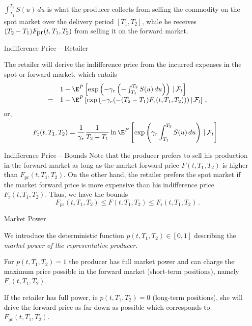 $\int_{T_1}^{T_2}S(u)\,du$ is what the
producer collects from selling the commodity on the spot market
over the delivery period $[T_1,T_2]$, while he receives
$(T_2-T_1)F_{\hbox{pr}}(t,T_1,T_2)$ from selling it on the forward
market.

{Indifference Price -- Retailer}

The retailer will derive the indifference price from the incurred expenses
in the spot or forward market, which entails
$$
\begin{array}{ll}
&1-\E^P\left[\exp\left(-\gamma_r\left(-\int_{T_1}^{T_2}S(u)\,du\right)\right)
\,|\,\mathcal{F}_t\right]\\
= &1-\E^P\left[\exp\left(-\gamma_r(-(T_2-T_1)F_{\text{r}}(t,T_1,T_2)\right))\,|\,
\mathcal{F}_t\right]\,,
\end{array}
$$
or,
\begin{equation}
F_{\text{r}}(t,T_1,T_2)=\frac1{\gamma_r}\frac1{T_2-T_1}\ln\E^P\left[
\exp\left(\gamma_r\int_{T_1}^{T_2}S(u)\,du\right)\,|\,\mathcal{F}_t\right]\,.
\end{equation}

{Indifference Price -- Bounds}
Note that the producer prefers to sell his production in the forward
market as long as the market forward price $F(t,T_1,T_2)$ is higher
than $F_{\text{pr}}(t,T_1,T_2)$. On the other hand, the retailer
prefers the spot market if the market forward price is more
expensive than his indifference price $F_{\text{r}}(t,T_1,T_2)$.
Thus, we have the bounds
\begin{equation}\label{bounds for forward}
F_{\text{pr}}(t,T_1,T_2)\leq F(t,T_1,T_2)\leq
F_{\text{r}}(t,T_1,T_2)\,.
\end{equation}

{Market Power}






	We introduce the deterministic function $p(t,T_1,T_2)\in[0,1]$
describing the \emph{market power of the representative producer}.

	For $p(t,T_1,T_2)=1$ the
producer has full market power and can charge the maximum price possible in the forward market (short-term positions),
namely $F_{\text{r}}(t,T_1,T_2)$.

	If the
retailer has full power, ie $p(t,T_1,T_2)=0$ (long-term positions), she will drive the
forward price as far down as possible which corresponds to
$F_{\text{pr}}(t,T_1,T_2)$.



